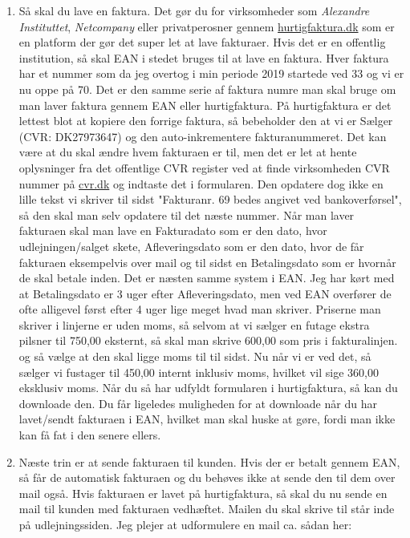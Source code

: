 \begin{enumerate}
    \item Så skal du lave en faktura. Det gør du for virksomheder som \textit{Alexandre Instituttet}, \textit{Netcompany} eller privatperosner gennem \href{https://www.hurtigfaktura.dk/}{hurtigfaktura.dk} som er en platform der gør det super let at lave fakturaer. Hvis det er en offentlig institution, så skal EAN i stedet bruges til at lave en faktura. Hver faktura har et nummer som da jeg overtog i min periode 2019 startede ved 33 og vi er nu oppe på 70. Det er den samme serie af faktura numre man skal bruge om man laver faktura gennem EAN eller hurtigfaktura. På hurtigfaktura er det lettest blot at kopiere den forrige faktura, så bebeholder den at vi er Sælger (CVR: DK27973647) og den auto-inkrementere fakturanummeret. Det kan være at du skal ændre hvem fakturaen er til, men det er let at hente oplysninger fra det offentlige CVR register ved at finde virksomheden CVR nummer på \href{https://cvr.dk}{cvr.dk} og indtaste det i formularen. Den opdatere dog ikke en lille tekst vi skriver til sidst "Fakturanr. 69 bedes angivet ved bankoverførsel", så den skal man selv opdatere til det næste nummer. Når man laver fakturaen skal man lave en Fakturadato som er den dato, hvor udlejningen/salget skete, Afleveringsdato som er den dato, hvor de får fakturaen eksempelvis over mail og til sidst en Betalingsdato som er hvornår de skal betale inden. Det er næsten samme system i EAN. Jeg har kørt med at Betalingsdato er 3 uger efter Afleveringsdato, men ved EAN overfører de ofte alligevel først efter 4 uger lige meget hvad man skriver. Priserne man skriver i linjerne er uden moms, så selvom at vi sælger en futage ekstra pilsner til 750,00 eksternt, så skal man skrive 600,00 som pris i fakturalinjen. og så vælge at den skal ligge moms til til sidst. Nu når vi er ved det, så sælger vi fustager til 450,00 internt inklusiv moms, hvilket vil sige 360,00 eksklusiv moms. Når du så har udfyldt formularen i hurtigfaktura, så kan du downloade den. Du får ligeledes muligheden for at downloade når du har lavet/sendt fakturaen i EAN, hvilket man skal huske at gøre, fordi man ikke kan få fat i den senere ellers.
    \item Næste trin er at sende fakturaen til kunden. Hvis der er betalt gennem EAN, så får de automatisk fakturaen og du behøves ikke at sende den til dem over mail også. Hvis fakturaen er lavet på hurtigfaktura, så skal du nu sende en mail til kunden med fakturaen vedhæftet. Mailen du skal skrive til står inde på udlejningssiden. Jeg plejer at udformulere en mail ca. sådan her:\\

\end{enumerate}
